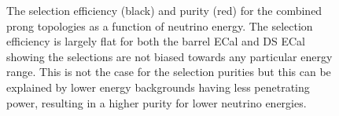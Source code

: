 \begin{figure}
  \centering
  \caption{The selection efficiency (black) and purity (red) for the combined prong topologies as a function of neutrino energy.  The selection efficiency is largely flat for both the barrel ECal and DS ECal showing the selections are not biased towards any particular energy range.  This is not the case for the selection purities but this can be explained by lower energy backgrounds having less penetrating power, resulting in a higher purity for lower neutrino energies.}
  \label{fig:EffPurSummedTopologies}
\end{figure}
\newline
\newline
